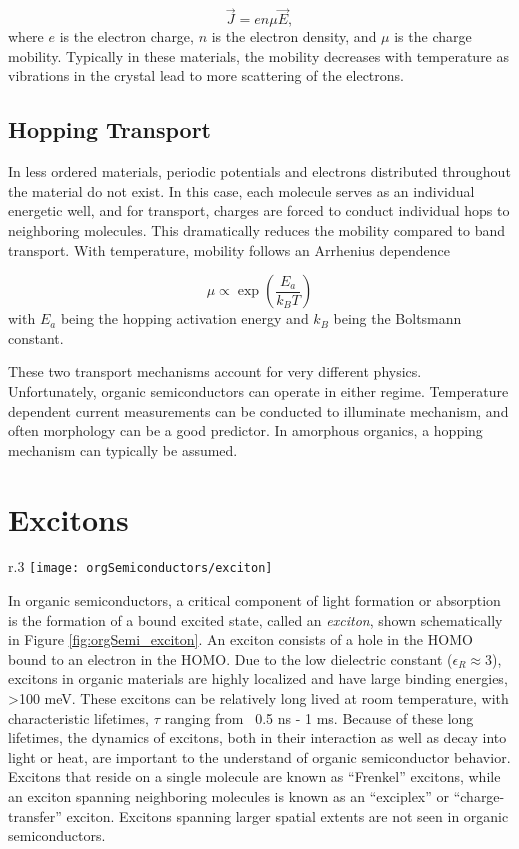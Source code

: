 \documentclass[../thesis.tex]{subfiles}
\begin{document}
\[\vec{J}=en\mu \vec{E},\]
where $e$ is the electron charge, $n$ is the electron density, and $\mu$ is the charge mobility.
Typically in these materials, the mobility decreases with temperature as vibrations in the crystal lead to more scattering of the electrons.


\subsection{Hopping Transport}

In less ordered materials, periodic potentials and electrons distributed throughout the material do not exist.
In this case, each molecule serves as an individual energetic well, and for transport, charges are forced to conduct individual hops to neighboring molecules. 
This dramatically reduces the mobility compared to band transport.
With temperature, mobility follows an Arrhenius dependence

\[\mu \propto \exp\left(\frac{E_a}{k_BT}\right)\]
with $E_a$ being the hopping activation energy and $k_B$ being the Boltsmann constant.

These two transport mechanisms account for very different physics.
Unfortunately, organic semiconductors can operate in either regime.
Temperature dependent current measurements can be conducted to illuminate mechanism, and often morphology can be a good predictor.
In amorphous organics, a hopping mechanism can typically be assumed.

\section{Excitons}\label{sec:excitons}

\begin{wrapfigure}{r}{.3\textwidth}
\centering
\texttt{[image: orgSemiconductors/exciton]}
\caption{Schematic view of an exciton.  $S_0$ and $S_1$ are the ground and first singlet excited state, respectively.}
\label{fig:orgSemi_exciton}
\end{wrapfigure}

In organic semiconductors, a critical component of light formation or absorption is the formation of a bound excited state, called an \textit{exciton}, shown schematically in Figure \ref{fig:orgSemi_exciton}.
An exciton consists of a hole in the HOMO bound to an electron in the HOMO.  
Due to the low dielectric constant ($\epsilon_R\approx 3$), excitons in organic materials are highly localized and have large binding energies, >100 meV.\supercite{Turro1991a}
These excitons can be relatively long lived at room temperature, with characteristic lifetimes, $\tau$ ranging from ~0.5 ns - 1 ms.  
Because of these long lifetimes, the dynamics of excitons, both in their interaction as well as decay into light or heat, are important to the understand of organic semiconductor behavior.
Excitons that reside on a single molecule are known as ``Frenkel'' excitons, while an exciton spanning neighboring molecules is known as an ``exciplex'' or ``charge-transfer'' exciton.
Excitons spanning larger spatial extents are not seen in organic semiconductors.
\end{document}
